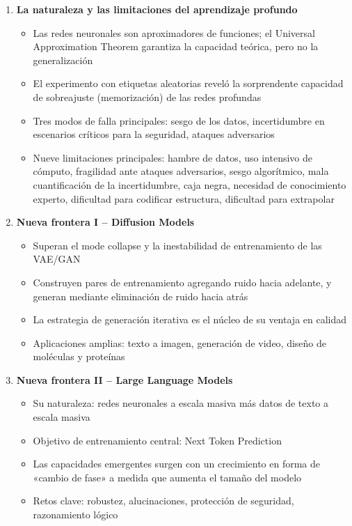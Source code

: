 \documentclass[a4paper]{article}
\begin{document}
\begin{enumerate}
    \item \textbf{La naturaleza y las limitaciones del aprendizaje profundo}
    \begin{itemize}
        \item Las redes neuronales son aproximadores de funciones; el Universal Approximation Theorem garantiza la capacidad teórica, pero no la generalización
        \item El experimento con etiquetas aleatorias reveló la sorprendente capacidad de sobreajuste (memorización) de las redes profundas
        \item Tres modos de falla principales: sesgo de los datos, incertidumbre en escenarios críticos para la seguridad, ataques adversarios
        \item Nueve limitaciones principales: hambre de datos, uso intensivo de cómputo, fragilidad ante ataques adversarios, sesgo algorítmico, mala cuantificación de la incertidumbre, caja negra, necesidad de conocimiento experto, dificultad para codificar estructura, dificultad para extrapolar
    \end{itemize}

    \item \textbf{Nueva frontera I -- Diffusion Models}
    \begin{itemize}
        \item Superan el mode collapse y la inestabilidad de entrenamiento de las VAE/GAN
        \item Construyen pares de entrenamiento agregando ruido hacia adelante, y generan mediante eliminación de ruido hacia atrás
        \item La estrategia de generación iterativa es el núcleo de su ventaja en calidad
        \item Aplicaciones amplias: texto a imagen, generación de video, diseño de moléculas y proteínas
    \end{itemize}

    \item \textbf{Nueva frontera II -- Large Language Models}
    \begin{itemize}
        \item Su naturaleza: redes neuronales a escala masiva más datos de texto a escala masiva
        \item Objetivo de entrenamiento central: Next Token Prediction
        \item Las capacidades emergentes surgen con un crecimiento en forma de «cambio de fase» a medida que aumenta el tamaño del modelo
        \item Retos clave: robustez, alucinaciones, protección de seguridad, razonamiento lógico
    \end{itemize}
\end{enumerate}
\end{document}
